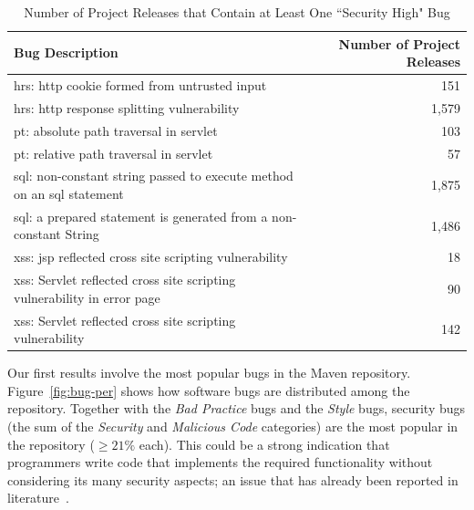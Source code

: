\documentclass{sig-alternate}
\begin{document}
\begin{table}[t]
\centering
\caption{Number of Project Releases that Contain at Least One ``Security
  High" Bug}
\label{tbl:sev}
\leavevmode
	\begin{tabular}{p{31em} r}
	\hline
	Bug Description & Number of Project Releases\\
 	\hline
	{\sc hrs}: {\sc http} cookie formed from untrusted input & 151\\
	{\sc hrs}: {\sc http} response splitting vulnerability & 1,579\\
	{\sc pt}: absolute path traversal in servlet  & 103\\
	{\sc pt}: relative path traversal in servlet & 57\\
	{\sc sql}: non-constant string passed to execute method on an {\sc sql} statement & 1,875\\
	{\sc sql}: a prepared statement is generated from a non-constant String & 1,486\\
	{\sc xss}: {\sc jsp} reflected cross site scripting vulnerability & 18\\
	{\sc xss}: Servlet reflected cross site scripting vulnerability in error page & 90\\
	{\sc xss}: Servlet reflected cross site scripting vulnerability & 142\\
	\hline
	\end{tabular}
\end{table}

Our first results involve the most popular bugs in the Maven repository.
Figure~\ref{fig:bug-per} shows how software bugs are distributed among the
repository. Together with the {\it Bad Practice} bugs and the {\it Style} bugs,
security bugs (the sum of the {\it Security} and {\it Malicious Code}
categories) are the most popular in the repository ($\geq 21\%$ each).
This could be a strong indication that programmers write code
that implements the required functionality without considering its many
security aspects; an issue that has already been reported in
literature~\cite{SH09}.
\end{document}
